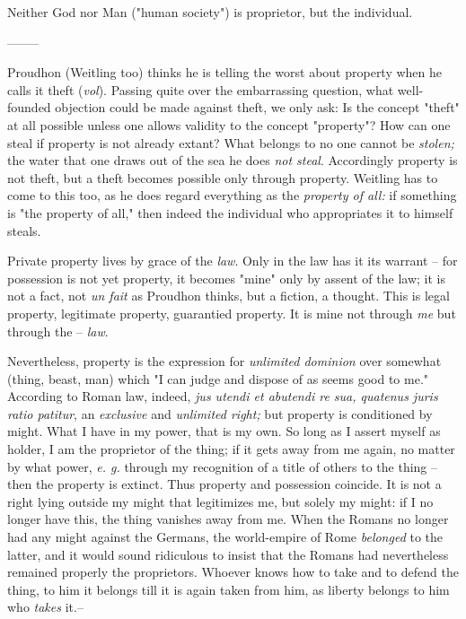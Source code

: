 \documentclass[a4paper]{book}
\begin{document}
Neither God nor Man ("{}human society"{}) is proprietor, but the individual.

\begin{center}
--------\end{center}


Proudhon (Weitling too) thinks he is telling the worst about property when he 
calls it theft (\textit{vol}). Passing quite over the embarrassing question, 
what well-founded objection could be made against theft, we only ask: Is the 
concept "{}theft"{} at all possible unless one allows validity to the concept 
"{}property"{}? How can one steal if property is not already extant? What 
belongs to no one cannot be \textit{stolen;} the water that one draws out of 
the sea he does \textit{not steal}. Accordingly property is not theft, but a 
theft becomes possible only through property. Weitling has to come to this 
too, as he does regard everything as the \textit{property of all:} if 
something is "{}the property of all,"{} then indeed the individual who 
appropriates it to himself steals.

Private property lives by grace of the \textit{law}. Only in the law has it 
its warrant -- for possession is not yet property, it becomes "{}mine"{} only 
by assent of the law; it is not a fact, not \textit{un fait} as Proudhon 
thinks, but a fiction, a thought. This is legal property, legitimate property, 
guarantied property. It is mine not through \textit{me} but through the -- 
\textit{law}.

Nevertheless, property is the expression for \textit{unlimited dominion} over 
somewhat (thing, beast, man) which "{}I can judge and dispose of as seems good 
to me."{} According to Roman law, indeed, \textit{jus utendi et abutendi re 
sua, quatenus juris ratio patitur}, an \textit{exclusive} and 
\textit{unlimited right;} but property is conditioned by might. What I have in 
my power, that is my own. So long as I assert myself as holder, I am the 
proprietor of the thing; if it gets away from me again, no matter by what 
power, \textit{e. g.} through my recognition of a title of others to the thing 
-- then the property is extinct. Thus property and possession coincide. It is 
not a right lying outside my might that legitimizes me, but solely my might: 
if I no longer have this, the thing vanishes away from me. When the Romans no 
longer had any might against the Germans, the world-empire of Rome 
\textit{belonged} to the latter, and it would sound ridiculous to insist that 
the Romans had nevertheless remained properly the proprietors. Whoever knows 
how to take and to defend the thing, to him it belongs till it is again taken 
from him, as liberty belongs to him who \textit{takes} it.--
\end{document}
